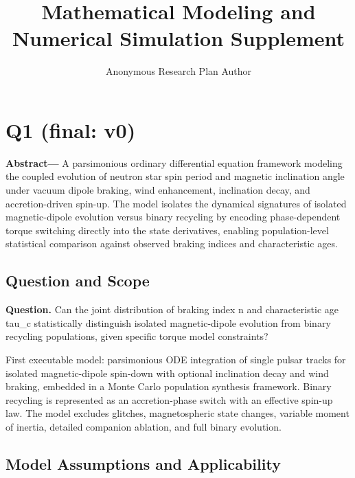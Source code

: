 \documentclass[11pt]{article}
\title{Mathematical Modeling and Numerical Simulation Supplement}
\author{Anonymous Research Plan Author}
\date{}
\begin{document}
\setlength{\emergencystretch}{3em}

\maketitle

\section{Q1 (final: v0)}

\noindent\textbf{Abstract—} A parsimonious ordinary differential equation framework modeling the coupled evolution of neutron star spin period and magnetic inclination angle under vacuum dipole braking, wind enhancement, inclination decay, and accretion-driven spin-up. The model isolates the dynamical signatures of isolated magnetic-dipole evolution versus binary recycling by encoding phase-dependent torque switching directly into the state derivatives, enabling population-level statistical comparison against observed braking indices and characteristic ages.

\subsection{Question and Scope}

\noindent\textbf{Question.} Can the joint distribution of braking index n and characteristic age tau\_c statistically distinguish isolated magnetic-dipole evolution from binary recycling populations, given specific torque model constraints?



First executable model: parsimonious ODE integration of single pulsar tracks for isolated magnetic-dipole spin-down with optional inclination decay and wind braking, embedded in a Monte Carlo population synthesis framework. Binary recycling is represented as an accretion-phase switch with an effective spin-up law. The model excludes glitches, magnetospheric state changes, variable moment of inertia, detailed companion ablation, and full binary evolution.

\subsection{Model Assumptions and Applicability}
\end{document}
